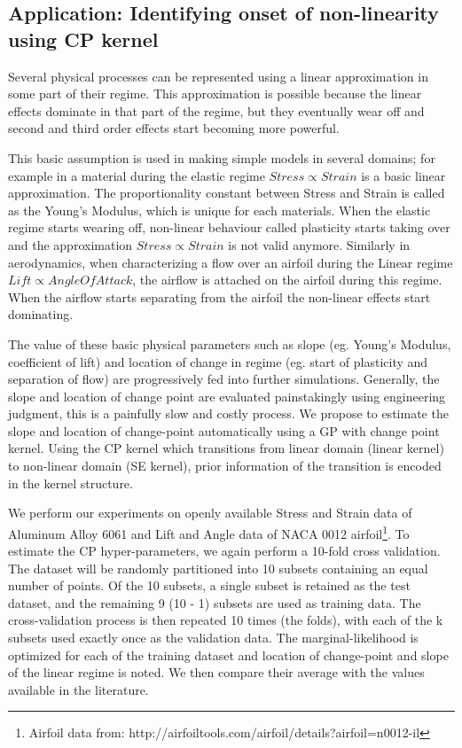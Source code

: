 \subsection{Application: Identifying onset of non-linearity  using CP kernel}\label{subsubsecCh4ApplicationCP}
Several physical processes can be represented using a linear approximation in some part of their regime. This approximation is possible because the linear effects dominate in that part of the regime, but they eventually wear off and second and third order effects start becoming more powerful. 

This basic assumption is used in making simple models in several domains; for example in a material during the elastic regime $Stress \propto Strain$ is a basic linear approximation. The proportionality constant between Stress and Strain is called as the Young's Modulus, which is unique for each materials. When the elastic regime starts wearing off, non-linear behaviour called plasticity starts taking over and the approximation $Stress \propto Strain$ is not valid anymore. Similarly in aerodynamics, when characterizing a flow over an airfoil during the Linear regime  $ Lift \propto Angle Of Attack$, the airflow is attached on the airfoil during this regime. When the airflow starts separating from the airfoil the non-linear effects start dominating. 

\begin{mdframed}[hidealllines=true,backgroundcolor=blue!20]
The value of these basic physical parameters such as slope (eg. Young's Modulus, coefficient of lift) and location of change in regime (eg. start of plasticity and separation of flow) are progressively fed into further simulations. Generally, the slope and location of change point are evaluated painstakingly using engineering judgment, this is a painfully slow and costly process. We propose to estimate the slope and location of change-point automatically using a GP with change point kernel. Using the CP kernel which transitions from linear domain (linear kernel) to non-linear domain (SE kernel), prior information of the transition is encoded in the kernel structure. 

We perform our experiments on openly available Stress and Strain data of Aluminum Alloy 6061 \cite{kaufman1999properties} and Lift and Angle data of NACA 0012 airfoil\footnote{Airfoil data from: http://airfoiltools.com/airfoil/details?airfoil=n0012-il}. To estimate the CP hyper-parameters, we again perform a 10-fold cross validation. The dataset will be randomly partitioned into 10 subsets containing an equal number of points. Of the 10 subsets, a single subset is retained as the test dataset, and the remaining 9 (10 - 1) subsets are used as training data. The cross-validation process is then repeated 10 times (the folds), with each of the k subsets used exactly once as the validation data. The marginal-likelihood is optimized for each of the training dataset and location of change-point and slope of the linear regime is noted. We then compare their average with the values available in the literature. 
\end{mdframed}


